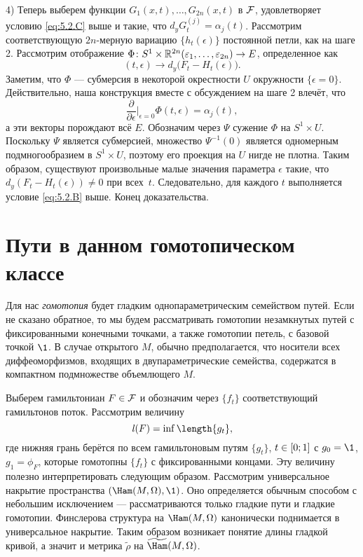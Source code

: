 4) Теперь выберем функции $G_1(x,t),\dots, G_{2n}(x,t)$ в $\mathcal{F}$, удовлетворяет условию \ref{eq:5.2.C} выше и такие, что $d_y G_t^{(j)} = \alpha_j (t)$.
Рассмотрим соответствующую $2n$-мерную вариацию $\{h_t (\epsilon)\}$ постоянной петли, как на шаге 2.
Рассмотрим отображение $\Phi\colon S^1 \times \mathbb{R}^{2n} (\varepsilon_1 ,\dots, \varepsilon_{2n}) \to E$, определенное как 
\[(t, \epsilon) \to d_y \big(F_t - H_t (\epsilon)\big).\]
Заметим, что $\Phi$ — субмерсия в некоторой окрестности $U$ окружности $\{\epsilon = 0\}$.
Действительно, наша конструкция вместе с обсуждением на шаге 2 влечёт, что 
\[\frac{\partial}{\partial\epsilon}|_{\epsilon = 0} \Phi (t, \epsilon) = \alpha_j (t),\]
а эти векторы порождают всё $E$.
Обозначим через $\Psi$ сужение $\Phi$ на $S^1 \times U$.
Поскольку $\Psi$ является субмерсией, множество $\Psi^{-1} (0)$ является одномерным подмногообразием в $S^1 \times U$, поэтому его проекция на $U$ нигде не плотна.
Таким образом, существуют произвольные малые значения параметра $\epsilon$ такие, что $d_y (F_t - H_t (\epsilon)) \ne 0$ при всех~$t$.
Следовательно, для каждого $t$ выполняется условие \ref{eq:5.2.B} выше.
Конец доказательства.
\qeds

\section{Пути в данном гомотопическом классе}\label{5.3}

Для нас \emph{гомотопия} будет гладким однопараметрическим семейством путей.
Если не сказано обратное, то мы будем рассматривать гомотопии незамкнутых путей с фиксированными конечными точками, а также гомотопии петель, с базовой точкой $\1$.
В случае открытого $M$, обычно предполагается, что носители всех диффеоморфизмов, входящих в двупараметрические семейства, содержатся в компактном подмножестве объемлющего $M$.

Выберем гамильтониан $F \in \mathcal{F}$ и обозначим через $\{f_t\}$ соответствующий гамильтонов поток.
Рассмотрим величину 
\[\l(F) = \inf \length \{g_t\},\]
где нижняя грань берётся по всем гамильтоновым путям $\{g_t\}$, $t
\z\in [0; 1]$ с $g_0 = \1$, $g_1 = \phi_F$, которые гомотопны
$\{f_t\}$ с фиксированными концами. 
Эту величину полезно интерпретировать следующим образом.
Рассмотрим универсальное накрытие 
пространства $(\Ham (M, \Omega), \1)$. 
Оно определяется обычным способом с небольшим исключением —
рассматриваются только гладкие пути и гладкие гомотопии. 
Финслерова структура на $\Ham (M, \Omega)$ канонически поднимается в
универсальное накрытие. 
Таким образом возникает понятие длины гладкой кривой, а значит и
метрика $\tilde\rho$ на  $\widetilde\Ham(M, \Omega)$. 

